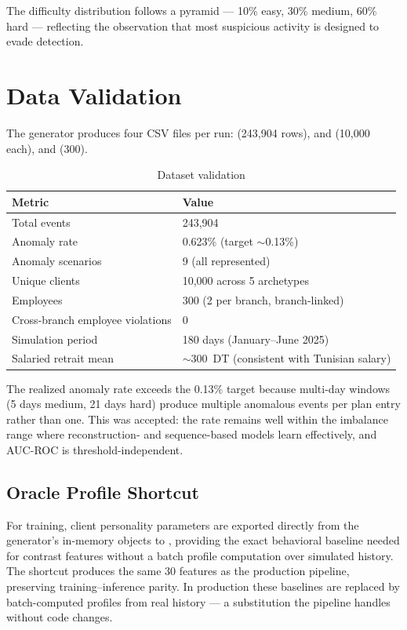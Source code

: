 The difficulty distribution follows a pyramid --- 10\% easy, 30\% medium, 60\% hard --- reflecting the observation that most suspicious activity is designed to evade detection.

\section{Data Validation}

The generator produces four CSV files per run:  (243{,}904 rows),  and  (10{,}000 each), and  (300).

\begin{table}[htbp]
\centering
\small
\caption{Dataset validation}
\begin{tabular}{@{}ll@{}}
\toprule
\textbf{Metric} & \textbf{Value} \\
\midrule
Total events & 243{,}904 \\
Anomaly rate & 0.623\% (target $\sim$0.13\%) \\
Anomaly scenarios & 9 (all represented) \\
Unique clients & 10{,}000 across 5 archetypes \\
Employees & 300 (2 per branch, branch-linked) \\
Cross-branch employee violations & 0 \\
Simulation period & 180 days (January--June 2025) \\
Salaried retrait mean & $\sim$300~DT (consistent with Tunisian salary) \\
\bottomrule
\end{tabular}
\end{table}

The realized anomaly rate exceeds the 0.13\% target because multi-day windows (5 days medium, 21 days hard) produce multiple anomalous events per plan entry rather than one. This was accepted: the rate remains well within the imbalance range where reconstruction- and sequence-based models learn effectively, and AUC-ROC is threshold-independent.

\subsection{Oracle Profile Shortcut}

For training, client personality parameters are exported directly from the generator's in-memory objects to , providing the exact behavioral baseline needed for contrast features without a batch profile computation over simulated history. The shortcut produces the same 30 features as the production pipeline, preserving training--inference parity. In production these baselines are replaced by batch-computed profiles from real history --- a substitution the pipeline handles without code changes.
